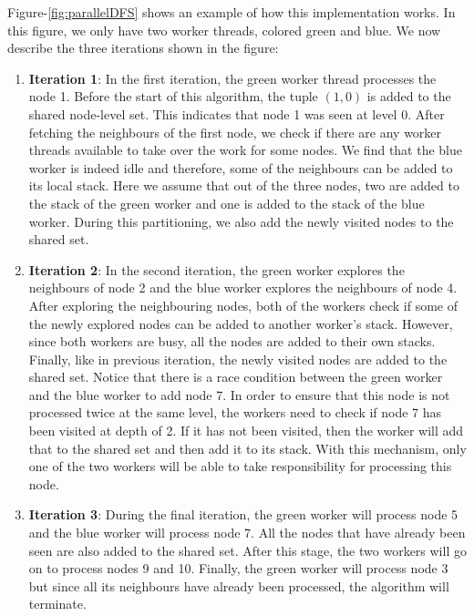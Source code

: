 Figure-\ref{fig:parallelDFS} shows an example of how this implementation works.
In this figure, we only have
two worker threads, colored green and blue. We now describe the three iterations
shown in the figure:
\begin{enumerate}
    \item \textbf{Iteration 1}: In the first iteration, the green worker thread
        processes the node 1. Before the start of this
        algorithm, the tuple $(1,0)$ is added to the shared node-level
        set. This indicates that node 1 was seen at level 0. After
        fetching the neighbours of the first node, we check if there are any
        worker threads available to take over the work for some nodes. We find
        that the blue worker is indeed idle and therefore, some of the
        neighbours can be added to its local stack. Here we assume that out of
        the three nodes, two are added to the stack of the green worker and one
        is added to the stack of the blue worker. During this partitioning, we
        also add the newly visited nodes to the shared set. 
    \item \textbf{Iteration 2}: In the second iteration, the green worker
        explores the neighbours of node 2 and the blue worker
        explores the neighbours of node 4. After exploring the
        neighbouring nodes, both of the workers check if some of the newly
        explored nodes can be added to another worker's stack. However, since
        both workers are busy, all the nodes are added to their own stacks.
        Finally, like in previous iteration, the newly visited nodes are added
        to the shared set. Notice that there is a race condition between the
        green worker and the blue worker to add node 7. In order to ensure that
        this node is not processed twice at the same level, the workers need to
        check if node 7 has been visited at depth of 2. If it has not been
        visited, then the worker will add that to the shared set and then add it
        to its stack. With this mechanism, only one of the two workers will be
        able to take responsibility for processing this node.
    \item \textbf{Iteration 3}: During the final iteration, the green worker
        will process node 5 and the blue worker will process node 7. All the
        nodes that have already been seen are also added to the shared set.
        After this stage, the two workers will go on to process nodes 9 and 10.
        Finally, the green worker will process node 3 but since all its
        neighbours have already been processed, the algorithm will terminate.
\end{enumerate}
